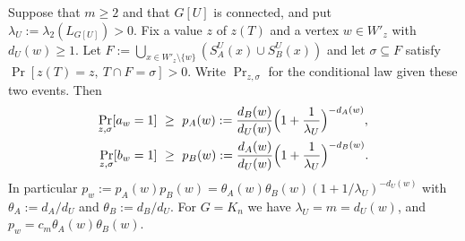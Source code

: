 \begin{lemma}\label{lem:kn-star}
Suppose that $m\ge2$ and that $G[U]$ is connected, and put $\lambda_U:=\lambda_2(L_{G[U]})>0$. Fix a value $z$ of $z(T)$ and a vertex $w\in W'_z$ with $d_U(w)\ge1$. Let $F:=\bigcup_{x\in W'_z\setminus\{w\}}(S^U_A(x)\cup S^U_B(x))$ and let $\sigma\subseteq F$ satisfy $\Pr[z(T)=z,\ T\cap F=\sigma]>0$. Write $\Pr_{z,\sigma}$ for the conditional law given these two events. Then
\begin{align*}
  \Pr_{z,\sigma}[a_w=1]\ &\ge\ p_A(w):=\frac{d_B(w)}{d_U(w)}\Bigl(1+\frac1{\lambda_U}\Bigr)^{-d_A(w)},\\
  \Pr_{z,\sigma}[b_w=1]\ &\ge\ p_B(w):=\frac{d_A(w)}{d_U(w)}\Bigl(1+\frac1{\lambda_U}\Bigr)^{-d_B(w)} .
\end{align*}
In particular $p_w:=p_A(w)p_B(w)=\theta_A(w)\theta_B(w)(1+1/\lambda_U)^{-d_U(w)}$ with $\theta_A:=d_A/d_U$ and $\theta_B:=d_B/d_U$. For $G=K_n$ we have $\lambda_U=m=d_U(w)$, and $p_w=c_m\theta_A(w)\theta_B(w)$.
\end{lemma}

